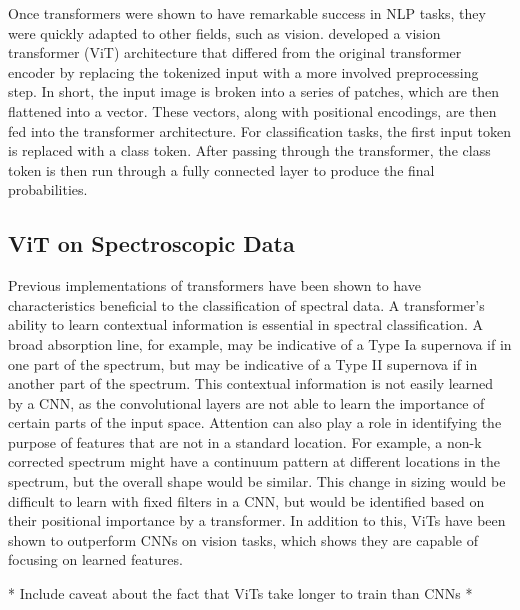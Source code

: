 Once transformers were shown to have remarkable success in NLP tasks, they were 
quickly adapted to other fields, such as vision. \textcite{dosovitskiy2020} developed 
a vision transformer (ViT) architecture that differed from the original transformer 
encoder by replacing the tokenized input with a more involved preprocessing step. In short, 
the input image is broken into a series of patches, which are then flattened into
a vector. These vectors, along with positional encodings, are then fed into the
transformer architecture. For classification tasks, the first input token is 
replaced with a class token. After passing through the transformer, the class token 
is then run through a fully connected layer to produce the final probabilities. 

\subsection{ViT on Spectroscopic Data}\label{sec:ViT}
Previous implementations of transformers have been shown to have characteristics 
beneficial to the classification of spectral data. A transformer's 
ability to learn contextual information is essential in spectral classification. 
A broad absorption line, for example, may be indicative of a Type Ia supernova 
if in one part of the spectrum, but may be indicative of a Type II supernova if
in another part of the spectrum. This contextual information is not easily learned 
by a CNN, as the convolutional layers are not able to learn the importance of
certain parts of the input space. Attention can also play a role in identifying 
the purpose of features that are not in a standard location. For example, a 
non-k corrected spectrum might have a continuum pattern at different locations 
in the spectrum, but the overall shape would be similar. This change in sizing 
would be difficult to learn with fixed filters in a CNN, but would be identified 
based on their positional importance by a transformer. In addition to this, ViTs 
have been shown to outperform CNNs on vision tasks, which shows they are capable 
of focusing on learned features. 


* Include caveat about the fact that ViTs take longer to train than CNNs *

